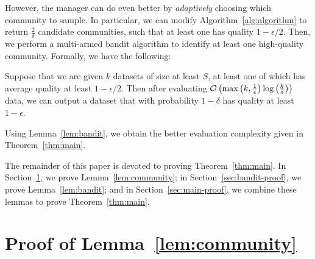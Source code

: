 \documentclass[anon,12pt]{colt2016} %
\newcommand{\quality}{\epsilon}
\newcommand{\failprob}{\delta}
\begin{document}
However, the manager can do even better by \emph{adaptively} choosing 
which community to sample. In particular, we can modify Algorithm~\ref{alg:algorithm} 
to return $\frac{2}{\delta}$ candidate communities, such that at least one 
has quality $1-\epsilon/2$. Then, we perform a multi-armed bandit 
algorithm to identify at least one high-quality community. Formally, 
we have the following:
\begin{lemma}
\label{lem:bandit}
Suppose that we are given $k$ datasets of size at least 
$S$, at least one of which has average 
quality at least $1-\quality/2$. Then after evaluating 
$\oo\p{\max\p{k,\frac{1}{\quality}}\log\p{\frac{k}{\failprob}}}$ 
data, we can output a dataset that with probability $1-\failprob$ 
has quality at least $1-\quality$.
\end{lemma}
Using Lemma~\ref{lem:bandit}, we obtain the better evaluation 
complexity given in Theorem~\ref{thm:main}.

The remainder of this paper is devoted to proving Theorem~\ref{thm:main}. 
In Section~\ref{sec:community-proof}, we prove Lemma~\ref{lem:community}; 
in Section~\ref{sec:bandit-proof}, we prove Lemma~\ref{lem:bandit}; 
and in Section~\ref{sec:main-proof}, we combine these lemmas
to prove Theorem~\ref{thm:main}.

\section{Proof of Lemma~\ref{lem:community}}
\label{sec:community-proof}

\newcommand{\nbad}{n_{\mathrm{bad}}}
\newcommand{\ncoop}{n_{\mathrm{coop}}}
\end{document}
